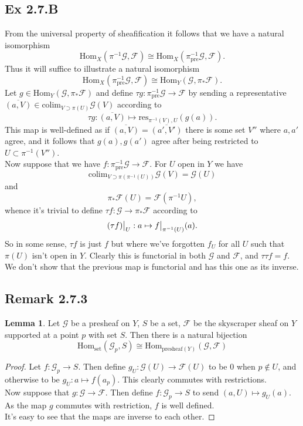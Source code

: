 \documentclass{article}
\newcommand\restr[2]{{%
  \left.\kern-\nulldelimiterspace %
  #1 %
  \vphantom{\big|} %
  \right|_{#2} %
  }}
\theoremstyle{definition}
\newtheorem{lemma}[theorem]{Lemma}
\newcommand{\Hom}{\text{Hom}}
\newcommand{\colim}{\text{colim}}
\begin{document}
\subsection*{Ex 2.7.B}

From the universal property of sheafification it follows that
we have a natural isomorphism
\[
	\Hom_{X}(\pi^{-1}\mathcal{G}, \mathcal{F})
	\cong
	\Hom_{X}(\pi^{-1}_{\text{pre}}\mathcal{G}, \mathcal{F}).
\]
Thus it will suffice to illustrate a natural isomorphism
\[
	\Hom_{X}(\pi^{-1}_{\text{pre}}\mathcal{G}, \mathcal{F})
	\cong
	\Hom_{Y}(\mathcal{G}, \pi_{*}\mathcal{F}).
\]
Let $g \in \Hom_{Y}(\mathcal{G}, \pi_{*}\mathcal{F})$ and define
$\tau g : \pi^{-1}_{\text{pre}}\mathcal{G} \to \mathcal{F}$
by sending a representative $\overline{(a, V)} \in \colim_{V \supset \pi(U)} \mathcal{G}(V)$
according to
\[
	\tau g
	:
	\overline{(a, V)}
	\mapsto
	\text{res}_{\pi^{-1}(V), U}(g(a)).
\]
This map is well-defined as if $\overline{(a, V)} = \overline{(a', V')}$ there
is some set $V''$ where $a, a'$ agree, and it follows that $g(a), g(a')$ agree
after being restricted to $U \subset \pi^{-1}(V'')$. \\

Now suppose that we have $f : \pi^{-1}_{\text{pre}}\mathcal{G} \to
	\mathcal{F}$. For $U$ open in $Y$ we have
\[
	\colim_{V \supset \pi(\pi^{-1}(U))}
	\mathcal{G}(V)
	=
	\mathcal{G}(U)
\]
and
\[
	\pi_{*}\mathcal{F}(U)
	=
	\mathcal{F}(\pi^{-1}U),
\]
whence it's trivial to define $\tau f : \mathcal{G}
	\to \pi_{*}\mathcal{F}$ according to
\[
	\restr{(\tau f)}{U}
	:
	a
	\mapsto
	\restr{f}{\pi^{-1}(U)}(a).
\]
So in some sense, $\tau f$ is just $f$ but where we've forgotten $f_U$ for all
$U$ such that $\pi(U)$ isn't open in $Y$. Clearly this is functorial in both
$\mathcal{G}$ and $\mathcal{F}$, and $\tau \tau f = f$. We don't show that the
previous map is functorial and has this one as its inverse.

\subsection*{Remark 2.7.3}

\begin{lemma}
	Let $\mathcal{G}$ be a presheaf on $Y$, $S$ be a set, $\mathcal{F}$ be the
	skyscraper sheaf on $Y$ supported at a point $p$ with set $S$. Then there
	is a natural bijection
	\[
		\Hom_{\text{set}}(\mathcal{G}_{p}, S)
		\cong
		\Hom_{\text{presheaf}(Y)}(\mathcal{G}, \mathcal{F})
	\]
\end{lemma}
\begin{proof}
	Let $f : \mathcal{G}_{p} \to S$. Then define $g_U : \mathcal{G}(U) \to
		\mathcal{F}(U)$ to be $0$ when $p \not \in U$, and otherwise to be $g_U : a
		\mapsto f(a_p)$. This clearly commutes with restrictions. \\

	Now suppose that $g : \mathcal{G} \to \mathcal{F}$. Then define $f :
		\mathcal{G}_{p} \to S$ to send $(a, U) \mapsto g_U(a)$. As the map $g$
	commutes with restriction, $f$ is well defined. \\

	It's easy to see that the maps are inverse to each other.
\end{proof}
\end{document}
